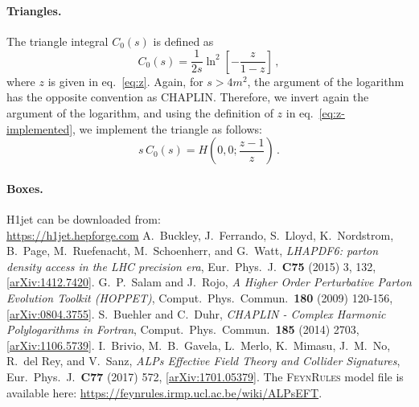 \documentclass[12pt,a4wide]{article}
\begin{document}
\paragraph{Triangles.} The triangle integral $C_0(s)$ is defined as
\begin{equation}
  \label{eq:triangle}
  C_0(s) = \frac{1}{2s}\ln^2\left[-\frac{z}{1-z}\right]\,,
\end{equation}
where $z$ is given in eq.~\eqref{eq:z}. Again, for $s>4m^2$, the argument of the logarithm has the opposite convention as CHAPLIN. Therefore, we invert again the argument of the logarithm, and using the definition of $z$ in eq.~\eqref{eq:z-implemented}, we implement the triangle as follows:
\begin{equation}
  \label{eq:triangle-HPL}
  s\,C_0(s) = H\left(0,0;\frac{z-1}{z}\right)\,.
\end{equation}

\paragraph{Boxes.}

\begin{thebibliography}{1}
    H1jet can be downloaded from: \\ \href{https://h1jet.hepforge.com}{https://h1jet.hepforge.com}
    A.\ Buckley, J.\ Ferrando, S.\ Lloyd, K.\ Nordstrom, B.\ Page, M.\ Ruefenacht, M.\ Schoenherr, and G.\ Watt, \textit{LHAPDF6: parton density access in the LHC precision era}, Eur.\ Phys.\ J.\ \textbf{C75} (2015) 3, 132, [\href{https://arxiv.org/abs/1412.7420}{arXiv:1412.7420}]. 
    G.\ P.\ Salam and J.\ Rojo, \textit{A Higher Order Perturbative Parton Evolution Toolkit (HOPPET)}, Comput.\ Phys.\ Commun.\ \textbf{180} (2009) 120-156, [\href{https://arxiv.org/abs/0804.3755}{arXiv:0804.3755}]. 
    S.\ Buehler and C.\ Duhr, \textit{CHAPLIN - Complex Harmonic Polylogarithms in Fortran}, Comput.\ Phys.\ Commun.\ \textbf{185} (2014) 2703, [\href{https://arxiv.org/abs/1106.5739}{arXiv:1106.5739}]. 
    I.\ Brivio, M.\ B.\ Gavela, L.\ Merlo, K.\ Mimasu, J.\ M.\ No, R.\ del Rey, and V.\ Sanz, \textit{ALPs Effective Field Theory and Collider Signatures}, Eur.\ Phys.\ J.\ \textbf{C77} (2017) 572, [\href{https://arxiv.org/abs/1701.05379}{arXiv:1701.05379}]. The \textsc{FeynRules} model file is available here: \href{https://feynrules.irmp.ucl.ac.be/wiki/ALPsEFT}{https://feynrules.irmp.ucl.ac.be/wiki/ALPsEFT}. 
\end{thebibliography}
\end{document}
